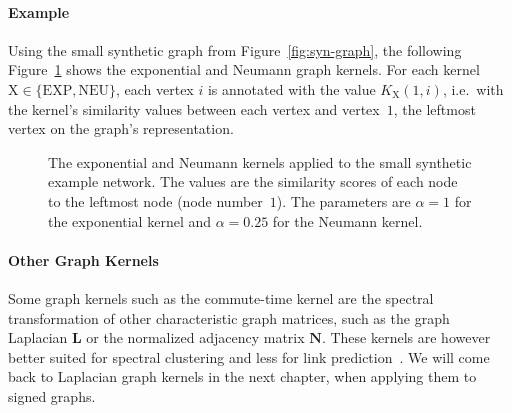 \documentclass[11pt,a4paper]{book}
\begin{document}
\paragraph{Example}
Using the small synthetic graph from Figure~\ref{fig:syn-graph}, the
following Figure~\ref{fig:syn-kernel} shows the exponential and 
Neumann graph kernels.  For each kernel $\mathrm X \in \{\mathrm{EXP},
\mathrm{NEU}\}$, each vertex $i$ is annotated with the value $K_{\mathrm
  X}(1, i)$, i.e.\ with the kernel's similarity values between each vertex
and vertex~$1$, the leftmost vertex on the graph's representation. 

\begin{figure}[h!]
  \caption{
    The exponential and Neumann kernels applied to the small
    synthetic example network.  The values are the similarity scores
    of each node to the leftmost node (node number~$1$).  The
    parameters are $\alpha =1$ for the exponential kernel and
    $\alpha=0.25$ for the Neumann kernel. 
  }
  \label{fig:syn-kernel}
\end{figure}

\paragraph{Other Graph Kernels}
Some graph kernels such as the commute-time kernel are the spectral
transformation of other 
characteristic graph matrices, such as the graph Laplacian $\mathbf L$
or the normalized
adjacency matrix $\mathbf N$.  These kernels
are however better suited for spectral clustering and less for link
prediction~\cite{b526}. 
We will come back to Laplacian graph kernels in the next chapter, when
applying them to signed graphs. 
\end{document}
